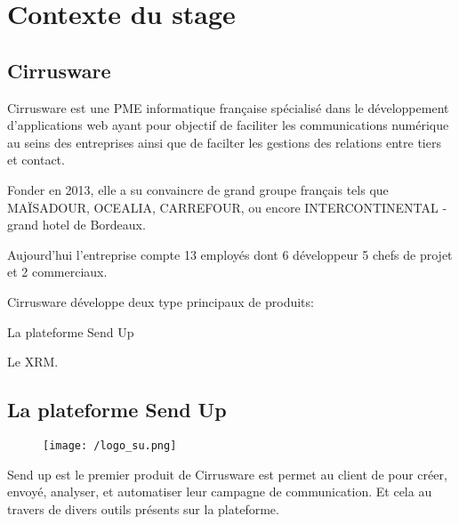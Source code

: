 \section{Contexte du stage}
\subsection{Cirrusware}
Cirrusware est une PME informatique française spécialisé dans le développement d'applications web ayant pour objectif de faciliter les communications numérique au seins des entreprises ainsi que de facilter les gestions des relations entre tiers et contact. 

Fonder en 2013, elle a su convaincre de grand groupe français tels que MAÏSADOUR, OCEALIA, CARREFOUR, ou encore INTERCONTINENTAL - grand hotel de Bordeaux. 

Aujourd'hui l'entreprise compte 13 employés dont 6 développeur 5 chefs de projet et 2 commerciaux. 

Cirrusware développe deux type principaux de produits: 
\begin{list}{}{}
    \item La plateforme Send Up
    \item Le XRM. 
\end{list}

\subsection{La plateforme Send Up}
\begin{figure}[!h]
\centering
    \texttt{[image: /logo\_su.png]}

\end{figure}
Send up est le premier produit de Cirrusware est permet au client de pour créer, envoyé, analyser, et automatiser leur campagne de communication. Et cela au travers de divers outils présents sur la plateforme.  

